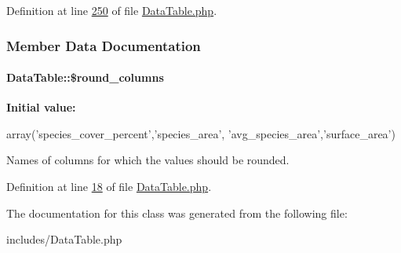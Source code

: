Definition at line \hyperlink{DataTable_8php_source_l00250}{250} of file \hyperlink{DataTable_8php_source}{Data\-Table.\-php}.



\subsubsection{Member Data Documentation}
\hypertarget{classDataTable_a70af4121fabf49b5d01b9e77c059a6cc}{
\paragraph[{\$round\-\_\-columns}]{\setlength{\rightskip}{0pt plus 5cm}Data\-Table\-::\$round\-\_\-columns}}\label{classDataTable_a70af4121fabf49b5d01b9e77c059a6cc}
{\bfseries Initial value\-:}
\begin{DoxyCode}
 array(\textcolor{stringliteral}{'species\_cover\_percent'},\textcolor{stringliteral}{'species\_area'},
        \textcolor{stringliteral}{'avg\_species\_area'},\textcolor{stringliteral}{'surface\_area'})
\end{DoxyCode}


Names of columns for which the values should be rounded. 



Definition at line \hyperlink{DataTable_8php_source_l00018}{18} of file \hyperlink{DataTable_8php_source}{Data\-Table.\-php}.



The documentation for this class was generated from the following file\-:\begin{DoxyCompactItemize}
\item 
includes/Data\-Table.\-php\end{DoxyCompactItemize}
